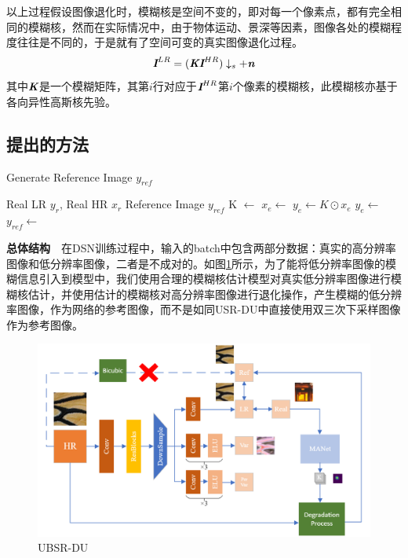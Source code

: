 以上过程假设图像退化时，模糊核是空间不变的，即对每一个像素点，都有完全相同的模糊核，然而在实际情况中，由于物体运动、景深等因素，图像各处的模糊程度往往是不同的，于是就有了空间可变的真实图像退化过程。
\begin{equation}
    \textbf{\em I}^{LR}=(\textbf{\em K}\textbf{\em I}^{HR})\downarrow_s+\textbf{\em n}\label{equ:degrade_sv}
\end{equation}
其中$\textbf{\em K}$是一个模糊矩阵，其第$i$行对应于$\textbf{\em I}^{HR}$第$i$个像素的模糊核，此模糊核亦基于各向异性高斯核先验。
\subsection{提出的方法}

\begin{algorithm}
    \caption{Generate Reference Image $y_{ref}$}
    \label{alg:y_ref}
    \begin{algorithmic}[1]
        \Require Real LR $y_r$, Real HR $x_r$
        \Ensure Reference Image $y_{ref}$
        \State K $\leftarrow $
        \State $x_{e} \leftarrow$ 
        \State $y_{e} \leftarrow K \odot x_{e}$
        \State $y_{e} \leftarrow$ 
        \State $y_{ref} \leftarrow$ 
    \end{algorithmic}
\end{algorithm}


\noindent\textbf{总体结构}\ \ 在DSN训练过程中，输入的batch中包含两部分数据：真实的高分辨率图像和低分辨率图像，二者是不成对的。如图\ref{fig:UBSR-DU}所示，为了能将低分辨率图像的模糊信息引入到模型中，我们使用合理的模糊核估计模型对真实低分辨率图像进行模糊核估计，并使用估计的模糊核对高分辨率图像进行退化操作，产生模糊的低分辨率图像，作为网络的参考图像，而不是如同USR-DU中直接使用双三次下采样图像作为参考图像。

\begin{figure}[h]
    \centering
    \includegraphics[width=1.0\textwidth]{imgs/UBSR-DU.png}
    \caption{UBSR-DU}
    \label{fig:UBSR-DU}
\end{figure}


